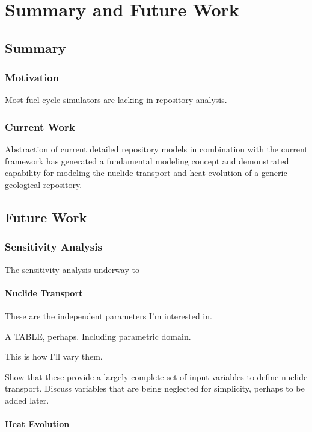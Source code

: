 \chapter{Summary and Future Work}\label{ch:future}

\section{Summary}

\subsection{Motivation}

Most fuel cycle simulators are lacking in repository analysis. 

\subsection{Current Work}

Abstraction of current detailed repository models in combination with the 
current \Cyclus framework has generated a fundamental modeling concept and 
demonstrated capability for modeling the nuclide transport and heat evolution of 
a generic geological repository.

\section{Future Work}

\subsection{Sensitivity Analysis}

The sensitivity analysis underway to 


\subsubsection{Nuclide Transport}

These are the independent parameters I'm interested in.

A TABLE, perhaps. Including parametric domain.

This is how I'll vary them.

Show that these provide a largely complete set of input variables to define 
nuclide transport. Discuss variables that are being neglected for simplicity, 
perhaps to be added later. 

\subsubsection{Heat Evolution}

